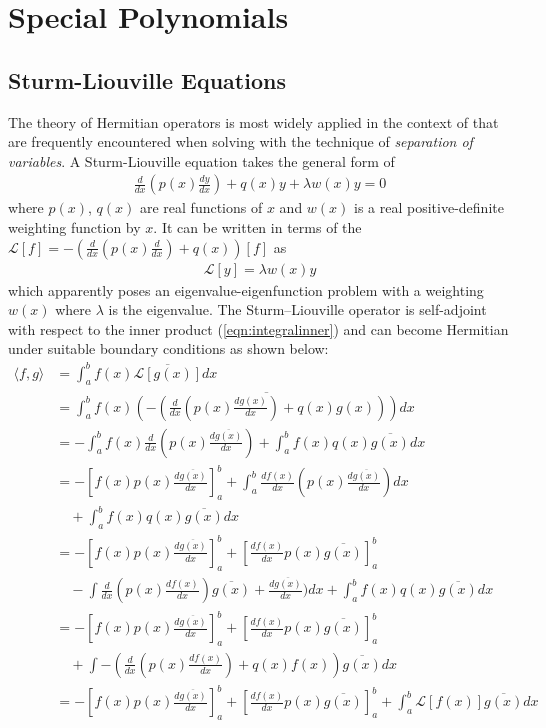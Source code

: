 \section{Special Polynomials}

\subsection{Sturm-Liouville Equations}

The theory of Hermitian operators is most widely applied in the context of  that are frequently encountered when solving  with the technique of \textit{separation of variables}. A Sturm-Liouville equation takes the general form of
\begin{align}
\frac{d}{dx} (p(x) \frac{dy}{dx}) + q(x) y + \lambda w(x)y = 0
\end{align}
where $p(x)$, $q(x)$ are real functions of $x$ and $w(x)$ is a real positive-definite weighting function by $x$. It can be written in terms of the  $\mathcal{L}[f] = -(\frac{d}{dx} (p(x) \frac{d}{dx}) + q(x))[f]$ as
\begin{align*}
\mathcal{L}[y] = \lambda w(x)y
\end{align*}
which apparently poses an eigenvalue-eigenfunction problem with a weighting $w(x)$ where $\lambda$ is the eigenvalue. The Sturm–Liouville operator is self-adjoint with respect to the inner product (\ref{eqn:integralinner}) and can become Hermitian under suitable boundary conditions as shown below:
\begin{align*}
\langle f, g \rangle &= \int_a^b f(x) \overline{\mathcal{L}[g(x)]} dx \\
&= \int_a^b f(x) \overline{\left(-(\frac{d}{dx} (p(x) \frac{dg(x)}{dx}) + q(x)g(x))\right)} dx \\
&= -\int_a^b f(x) \frac{d}{dx} (p(x) \frac{d\overline{g(x)}}{dx}) + \int_a^b f(x)q(x)\overline{g(x)} dx \\
&= -[f(x) p(x) \frac{d\overline{g(x)}}{dx}]_a^b + \int_a^b \frac{df(x)}{dx} (p(x) \frac{d\overline{g(x)}}{dx}) dx \\
&\quad + \int_a^b f(x)q(x)\overline{g(x)} dx \\
&= -[f(x) p(x) \frac{d\overline{g(x)}}{dx}]_a^b + [\frac{df(x)}{dx} p(x) \overline{g(x)}]_a^b \\
&\quad -\int \frac{d}{dx}(p(x) \frac{df(x)}{dx}) \overline{g(x)} + \frac{d\overline{g(x)}}{dx}) dx + \int_a^b f(x)q(x)\overline{g(x)} dx \\
&= -[f(x) p(x) \frac{d\overline{g(x)}}{dx}]_a^b + [\frac{df(x)}{dx} p(x) \overline{g(x)}]_a^b \\
&\quad + \int -(\frac{d}{dx}(p(x) \frac{df(x)}{dx}) + q(x)f(x)) \overline{g(x)} dx \\
&= -[f(x) p(x) \frac{d\overline{g(x)}}{dx}]_a^b + [\frac{df(x)}{dx} p(x) \overline{g(x)}]_a^b + \int_a^b \mathcal{L}[f(x)] \overline{g(x)} dx
\end{align*}
